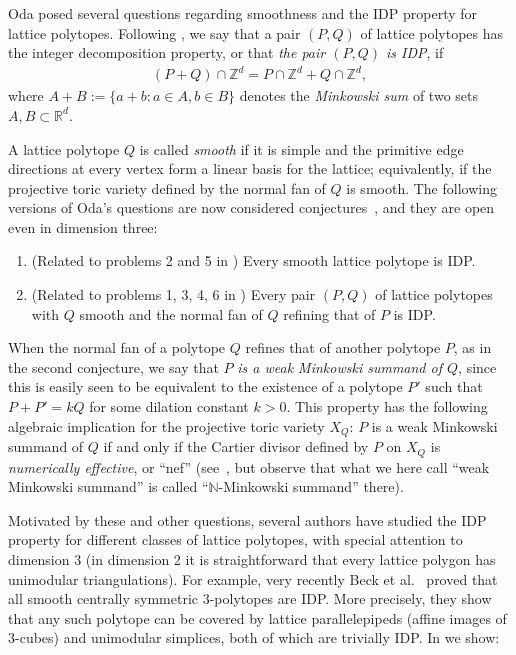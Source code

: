 \documentclass[12pt]{article}
\newcommand{\N}{ \ensuremath{\mathbb{N}}}
\newcommand{\Z}{ \ensuremath{\mathbb{Z}}}
\newcommand{\R}{ \ensuremath{\mathbb{R}}}
\begin{document}
Oda \cite{Oda1997} posed several questions regarding smoothness and the IDP property for lattice polytopes.
%
Following \cite{HaaseHof, Tsuchiya}, we say that a pair $(P, Q)$ of lattice polytopes has the integer decomposition property, or that \emph{the pair $(P,Q)$ is IDP}, if 
\begin{align*}
\label{eq:mixedIDP}
(P+Q) \cap \Z^d = P \cap \Z^d + Q \cap \Z^d,
\end{align*}
where $A+B :=\{a+b: a\in A, b\in B\}$ denotes the \emph{Minkowski sum} of two sets $A,B\subset \R^d$.

A lattice polytope $Q$ is called \emph{smooth} if it is simple and the primitive edge directions at every vertex form a linear basis for the lattice; equivalently, if the projective toric variety defined by the normal fan of $Q$ is smooth. 
The following versions of Oda's questions are now considered conjectures~\cite{HNPS2008,mfo2007}, and they are open even in dimension three:
\begin{conjecture}
\label{conj:Oda}
\begin{enumerate}
\item 
\label{itm:smoothIDP}
(Related to problems 2 and 5 in \cite{Oda1997})
Every smooth lattice polytope is IDP.
\item 
\label{itm:mixedIDP}
(Related to problems 1, 3, 4, 6 in \cite{Oda1997}) Every pair $(P,Q)$ of lattice polytopes with $Q$ smooth and the normal fan of $Q$ refining that of $P$ is IDP.
\end{enumerate}
\end{conjecture}

When the normal fan of a polytope $Q$ refines that of another polytope $P$, as in the second conjecture, we say that $P$ \emph{is a weak Minkowski summand of $Q$}, since this is easily seen to be equivalent to the existence of a polytope $P'$ such that $P+P' = k Q$ for some dilation constant $k>0$. 
This property has the following algebraic implication for the projective toric variety $X_Q$: $P$ is a weak Minkowski summand of $Q$ if and only if the Cartier divisor defined by $P$ on  $X_Q$ is \emph{numerically effective}, or ``nef'' (see~\cite[Cor.~6.2.15, Thm.~6.3.12]{CLS}, but observe that what we here call  ``weak Minkowski summand'' is called ``$\N$-Minkowski summand'' there). 


\medskip 
Motivated by these and other questions, several authors have studied the IDP property for different classes of lattice polytopes,
with special attention to dimension $3$ (in dimension 2 it is straightforward that every lattice polygon has unimodular triangulations). 
%
For example,  very recently
Beck et al.~\cite{BHHHJKM2019} proved that all smooth centrally symmetric $3$-polytopes are IDP.
More precisely, they show that any such polytope can be covered by lattice 
parallelepipeds (affine images of $3$-cubes) and unimodular simplices, both of which are trivially IDP.
%
In  we show:
\end{document}
